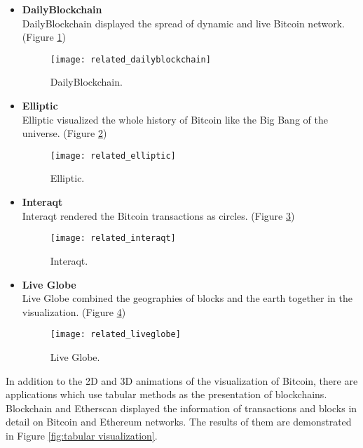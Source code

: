 \begin{itemize}
    \vspace*{\fill}
    \clearpage
    \vspace*{\fill}
    \item \textbf{DailyBlockchain} \cite{dailyblockchain} \\
        DailyBlockchain  displayed the spread of dynamic and live Bitcoin network. (Figure \ref{fig:dailyblockchain})
        \begin{figure}[htb]
            \centering
            \texttt{[image: related\_dailyblockchain]}
            \caption{DailyBlockchain.}
            \label{fig:dailyblockchain}
        \end{figure}
    \item \textbf{Elliptic} \cite{elliptic} \\
        Elliptic visualized the whole history of Bitcoin like the Big Bang of the universe. (Figure \ref{fig:elliptic})
        \begin{figure}[htb]
            \centering
            \texttt{[image: related\_elliptic]}
            \caption{Elliptic.}
            \label{fig:elliptic}
        \end{figure}
    \vspace*{\fill}
    \clearpage
    \item \textbf{Interaqt} \cite{interaqt} \\
        Interaqt rendered the Bitcoin transactions as circles. (Figure \ref{fig:interaqt})
        \begin{figure}[htb]
            \centering
            \texttt{[image: related\_interaqt]}
            \caption{Interaqt.}
            \label{fig:interaqt}
        \end{figure}
    \item \textbf{Live Globe} \cite{liveglobe} \\
        Live Globe combined the geographies of blocks and the earth together in the visualization. (Figure \ref{fig:live globe})
        \begin{figure}[htb]
            \centering
            \texttt{[image: related\_liveglobe]}
            \caption{Live Globe.}
            \label{fig:live globe}
        \end{figure}
\end{itemize}

In addition to the 2D and 3D animations of the visualization of Bitcoin, there are applications which use tabular methods as the presentation of blockchains. Blockchain \cite{blockchain} and Etherscan \cite{etherscan} displayed the information of transactions and blocks in detail on Bitcoin and Ethereum networks. The results of them are demonstrated in Figure \ref{fig:tabular visualization}.

